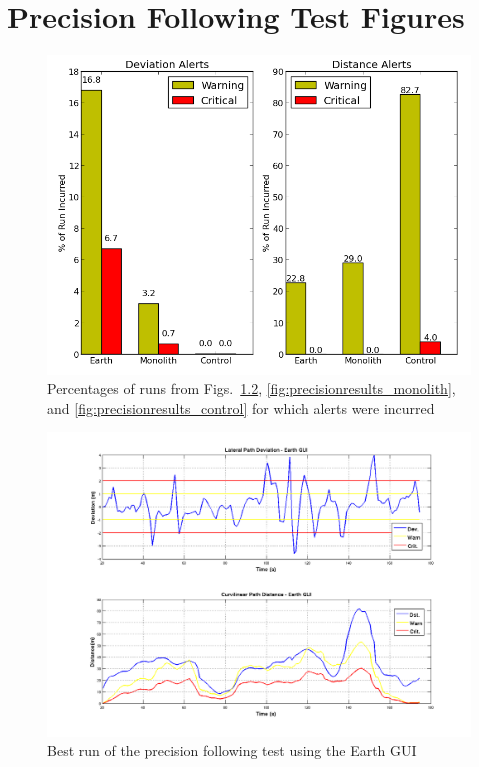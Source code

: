 
\chapter{Precision Following Test Figures} \label{app:precisionresults}


\begin{figure}[ht] \centering
    \includegraphics[width=6.5in]{./figs/precision_following_alert_percents.png}
    \caption{Percentages of runs from Figs.~\ref{fig:precisionresults_earth}, \ref{fig:precisionresults_monolith}, and \ref{fig:precisionresults_control} for which alerts were incurred}
    \label{fig:precision_alerts}
\end{figure}


\begin{figure}[ht] \centering %
    \includegraphics[width=5.5in]{./figs/precision_following_results_dst_dev_earth.png}
    \caption{Best run of the precision following test using the Earth GUI} \label{fig:precisionresults_earth}
\end{figure}

